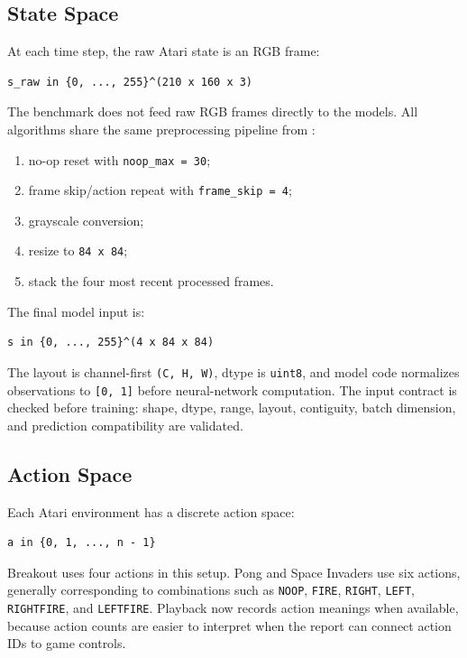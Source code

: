\documentclass[11pt]{article}
\begin{document}
\subsection*{State Space}

At each time step, the raw Atari state is an RGB frame:

\begin{verbatim}
s_raw in {0, ..., 255}^(210 x 160 x 3)
\end{verbatim}

The benchmark does not feed raw RGB frames directly to the models. All algorithms share the same preprocessing pipeline from :

\begin{enumerate}
\item no-op reset with \texttt{noop\_max = 30};
\item frame skip/action repeat with \texttt{frame\_skip = 4};
\item grayscale conversion;
\item resize to \texttt{84 x 84};
\item stack the four most recent processed frames.
\end{enumerate}

The final model input is:

\begin{verbatim}
s in {0, ..., 255}^(4 x 84 x 84)
\end{verbatim}

The layout is channel-first \texttt{(C, H, W)}, dtype is \texttt{uint8}, and model code normalizes observations to \texttt{[0, 1]} before neural-network computation. The input contract is checked before training: shape, dtype, range, layout, contiguity, batch dimension, and prediction compatibility are validated.

\subsection*{Action Space}

Each Atari environment has a discrete action space:

\begin{verbatim}
a in {0, 1, ..., n - 1}
\end{verbatim}

Breakout uses four actions in this setup. Pong and Space Invaders use six actions, generally corresponding to combinations such as \texttt{NOOP}, \texttt{FIRE}, \texttt{RIGHT}, \texttt{LEFT}, \texttt{RIGHTFIRE}, and \texttt{LEFTFIRE}. Playback now records action meanings when available, because action counts are easier to interpret when the report can connect action IDs to game controls.
\end{document}
